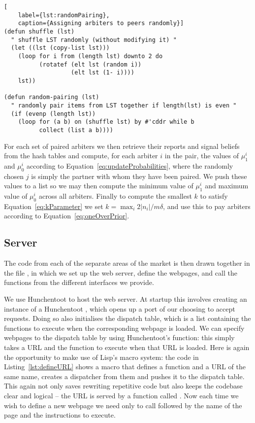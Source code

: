 \begin{lstlisting}[
	label={lst:randomPairing},
	caption={Assigning arbiters to peers randomly}]
(defun shuffle (lst)
  " shuffle LST randomly (without modifying it) "
  (let ((lst (copy-list lst)))
    (loop for i from (length lst) downto 2 do
          (rotatef (elt lst (random i))
                   (elt lst (1- i))))
    lst))

(defun random-pairing (lst)
  " randomly pair items from LST together if length(lst) is even "
  (if (evenp (length lst))
    (loop for (a b) on (shuffle lst) by #'cddr while b
          collect (list a b))))
\end{lstlisting}

For each set of paired arbiters we then retrieve their reports and signal
beliefs from the hash tables and compute, for each arbiter $i$ in the pair, the
values of $\mu_1^i$ and $\mu_0^i$ according to
Equation~\ref{eq:updateProbabilities}, where the randomly chosen $j$ is simply
the partner with whom they have been paired. We push these values to a list so
we may then compute the minimum value of $\mu_1^i$ and maximum value of
$\mu_0^i$ across all arbiters. Finally to compute the smallest $k$ to satisfy
Equation~\ref{eq:kParameter} we set $k = \max_i 2|n_i|/m\delta$, and use this
to pay arbiters according to Equation~\ref{eq:oneOverPrior}.

\subsection{Server}

\label{sec:server}

The code from each of the separate areas of the market is then drawn together
in the file , in which we set up the web server, define the
webpages, and call the functions from the different interfaces we provide.

We use Hunchentoot to host the web server. At startup this involves creating an
instance of a Hunchentoot , which opens up a port of our
choosing to accept requests. Doing so also initialises the dispatch table,
which is a list containing the functions to execute when the corresponding
webpage is loaded. We can specify webpages to the dispatch table by using
Hunchentoot's  function: this simply takes a URL
and the function to execute when that URL is loaded. Here is again the
opportunity to make use of Lisp's macro system: the code in
Listing~\ref{lst:defineURL} shows a macro that defines a function and a URL of
the same name, creates a dispatcher from them and pushes it to the dispatch
table. This again not only saves rewriting repetitive code but also keeps the
codebase clear and logical -- the URL  is served by a function
called . Now each time we wish to define a new webpage we need only
to call  followed by the name of the page and the
instructions to execute.

